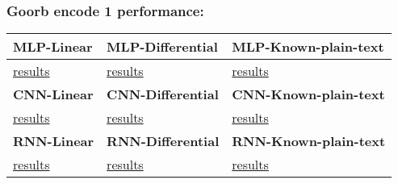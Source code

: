 \documentclass[oneside]{book}
\begin{document}
\subsubsection*{Goorb encode 1 performance:}

\begin{center}
\begin{tabular}{|>{\centering\arraybackslash}m{3cm}|>{\centering\arraybackslash}m{3cm}|>{\centering\arraybackslash}m{3cm}|} 
\hline
\rowcolor{cyan!20} \textbf{MLP-Linear} & \textbf{MLP-Differential} & \textbf{MLP-Known-plain-text} \\
\hline
\rowcolor{white} \href{https://github.com/bistoyek-official/Goorb-encode/tree/main/Goorb\%20Lab/Encryption/Performance/Goorb\%20encode\%201/MLP/Linear}{results} & \href{https://github.com/bistoyek-official/Goorb-encode/tree/main/Goorb\%20Lab/Encryption/Performance/Goorb\%20encode\%201/MLP/Differential}{results} & \href{https://github.com/bistoyek-official/Goorb-encode/tree/main/Goorb\%20Lab/Encryption/Performance/Goorb\%20encode\%201/MLP/Known-plain-text}{results} \\
\hline
\rowcolor{cyan!20} \textbf{CNN-Linear} & \textbf{CNN-Differential} & \textbf{CNN-Known-plain-text} \\
\hline
\rowcolor{white} \href{https://github.com/bistoyek-official/Goorb-encode/tree/main/Goorb\%20Lab/Encryption/Performance/Goorb\%20encode\%201/CNN/Linear}{results} & \href{https://github.com/bistoyek-official/Goorb-encode/tree/main/Goorb\%20Lab/Encryption/Performance/Goorb\%20encode\%201/CNN/Differential}{results} & \href{https://github.com/bistoyek-official/Goorb-encode/tree/main/Goorb\%20Lab/Encryption/Performance/Goorb\%20encode\%201/CNN/Known-plain-text}{results} \\
\hline
\rowcolor{cyan!20} \textbf{RNN-Linear} & \textbf{RNN-Differential} & \textbf{RNN-Known-plain-text} \\
\hline
\rowcolor{white} \href{https://github.com/bistoyek-official/Goorb-encode/tree/main/Goorb\%20Lab/Encryption/Performance/Goorb\%20encode\%201/RNN/Linear}{results} & \href{https://github.com/bistoyek-official/Goorb-encode/tree/main/Goorb\%20Lab/Encryption/Performance/Goorb\%20encode\%201/RNN/Differential}{results} & \href{https://github.com/bistoyek-official/Goorb-encode/tree/main/Goorb\%20Lab/Encryption/Performance/Goorb\%20encode\%201/RNN/Known-plain-text}{results} \\
\hline 
\end{tabular} 
\end{center}
\end{document}
